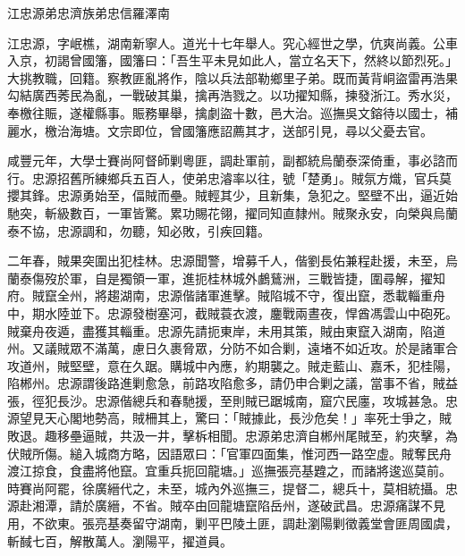 
\begin{pinyinscope}
江忠源弟忠濟族弟忠信羅澤南

江忠源，字岷樵，湖南新寧人。道光十七年舉人。究心經世之學，伉爽尚義。公車入京，初謁曾國籓，國籓曰：「吾生平未見如此人，當立名天下，然終以節烈死。」大挑教職，回籍。察教匪亂將作，陰以兵法部勒鄉里子弟。既而黃背峒盜雷再浩果勾結廣西莠民為亂，一戰破其巢，擒再浩戮之。以功擢知縣，揀發浙江。秀水災，奉檄往賑，遂權縣事。賑務畢舉，擒劇盜十數，邑大治。巡撫吳文鎔待以國士，補麗水，檄治海塘。文宗即位，曾國籓應詔薦其才，送部引見，尋以父憂去官。

咸豐元年，大學士賽尚阿督師剿粵匪，調赴軍前，副都統烏蘭泰深倚重，事必諮而行。忠源招舊所練鄉兵五百人，使弟忠濬率以往，號「楚勇」。賊氛方熾，官兵莫攖其鋒。忠源勇始至，偪賊而壘。賊輕其少，且新集，急犯之。堅壁不出，逼近始馳突，斬級數百，一軍皆驚。累功賜花翎，擢同知直隸州。賊聚永安，向榮與烏蘭泰不協，忠源調和，勿聽，知必敗，引疾回籍。

二年春，賊果突圍出犯桂林。忠源聞警，增募千人，偕劉長佑兼程赴援，未至，烏蘭泰傷歿於軍，自是獨領一軍，進扼桂林城外鸕鶿洲，三戰皆捷，圍尋解，擢知府。賊竄全州，將趨湖南，忠源偕諸軍進擊。賊陷城不守，復出竄，悉載輜重舟中，期水陸並下。忠源發樹塞河，截賊蓑衣渡，鏖戰兩晝夜，悍酋馮雲山中砲死。賊棄舟夜遁，盡獲其輜重。忠源先請扼東岸，未用其策，賊由東竄入湖南，陷道州。又議賊眾不滿萬，慮日久裹脅眾，分防不如合剿，遠堵不如近攻。於是諸軍合攻道州，賊堅壁，意在久踞。購城中內應，約期襲之。賊走藍山、嘉禾，犯桂陽，陷郴州。忠源謂後路進剿愈急，前路攻陷愈多，請仍申合剿之議，當事不省，賊益張，徑犯長沙。忠源偕總兵和春馳援，至則賊已踞城南，窟穴民廛，攻城甚急。忠源望見天心閣地勢高，賊柵其上，驚曰：「賊據此，長沙危矣！」率死士爭之，賊敗退。趣移壘逼賊，共汲一井，擊柝相聞。忠源弟忠濟自郴州尾賊至，約夾擊，為伏賊所傷。縋入城商方略，因語眾曰：「官軍四面集，惟河西一路空虛。賊奪民舟渡江掠食，食盡將他竄。宜重兵扼回龍塘。」巡撫張亮基韙之，而諸將逡巡莫前。時賽尚阿罷，徐廣縉代之，未至，城內外巡撫三，提督二，總兵十，莫相統攝。忠源赴湘潭，請於廣縉，不省。賊卒由回龍塘竄陷岳州，遂破武昌。忠源痛謀不見用，不欲東。張亮基奏留守湖南，剿平巴陵土匪，調赴瀏陽剿徵義堂會匪周國虞，斬馘七百，解散萬人。瀏陽平，擢道員。


\end{pinyinscope}
